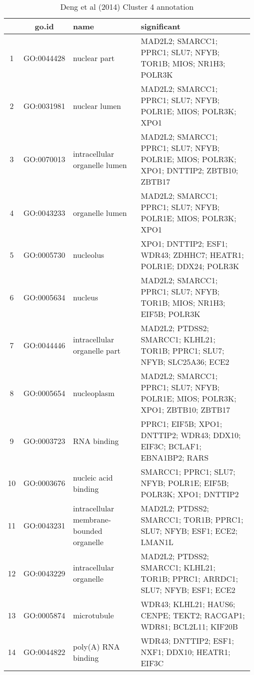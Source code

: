 \begin{table}[htp]
\begin{center}
\caption{Deng et al (2014) Cluster 4 annotation} \label{tab:tab8}
\begin{tabular}{|c|c|p{1.5in}|p{4in}|}
  \hline
 & go.id & name  & significant \\ 
  \hline
1 & GO:0044428 & nuclear part  & \footnotesize{MAD2L2; SMARCC1; PPRC1; SLU7; NFYB; TOR1B; MIOS; NR1H3; POLR3K} \\ 
  2 & GO:0031981 & nuclear lumen & \footnotesize{MAD2L2; SMARCC1; PPRC1; SLU7; NFYB; POLR1E; MIOS; POLR3K; XPO1}\\ 
  3 & GO:0070013 & intracellular organelle lumen & \footnotesize{MAD2L2; SMARCC1; PPRC1; SLU7; NFYB; POLR1E; MIOS; POLR3K; XPO1; DNTTIP2; ZBTB10; ZBTB17} \\ 
  4 & GO:0043233 & organelle lumen & \footnotesize{MAD2L2; SMARCC1; PPRC1; SLU7; NFYB; POLR1E; MIOS; POLR3K; XPO1} \\ 
  5 & GO:0005730 & nucleolus & \footnotesize{XPO1; DNTTIP2; ESF1; WDR43; ZDHHC7; HEATR1; POLR1E; DDX24; POLR3K} \\ 
  6 & GO:0005634 & nucleus & \footnotesize{MAD2L2; SMARCC1; PPRC1; SLU7; NFYB; TOR1B; MIOS; NR1H3; EIF5B; POLR3K} \\ 
  7 & GO:0044446 & intracellular organelle part & \footnotesize{MAD2L2; PTDSS2; SMARCC1; KLHL21; TOR1B; PPRC1; SLU7; NFYB; SLC25A36; ECE2} \\ 
  8 & GO:0005654 & nucleoplasm & \footnotesize{MAD2L2; SMARCC1; PPRC1; SLU7; NFYB; POLR1E; MIOS; POLR3K; XPO1; ZBTB10; ZBTB17} \\ 
  9 & GO:0003723 & RNA binding & \footnotesize{PPRC1; EIF5B; XPO1; DNTTIP2; WDR43; DDX10; EIF3C; BCLAF1; EBNA1BP2; RARS}\\ 
  10 & GO:0003676 & nucleic acid binding & \footnotesize{SMARCC1; PPRC1; SLU7; NFYB; POLR1E; EIF5B; POLR3K; XPO1; DNTTIP2} \\ 
  11 & GO:0043231 & intracellular membrane-bounded organelle &  \footnotesize{MAD2L2; PTDSS2; SMARCC1; TOR1B; PPRC1; SLU7; NFYB; ESF1; ECE2; LMAN1L} \\ 
  12 & GO:0043229 & intracellular organelle & \footnotesize{MAD2L2; PTDSS2; SMARCC1; KLHL21; TOR1B; PPRC1; ARRDC1; SLU7; NFYB; ESF1; ECE2} \\ 
  13 & GO:0005874 & microtubule & \footnotesize{WDR43; KLHL21; HAUS6; CENPE; TEKT2; RACGAP1; WDR81; BCL2L11; KIF20B} \\ 
  14 & GO:0044822 & poly(A) RNA binding & \footnotesize{WDR43; DNTTIP2; ESF1; NXF1; DDX10; HEATR1; EIF3C} \\ 

\end{tabular}
\end{center}
\end{table}
